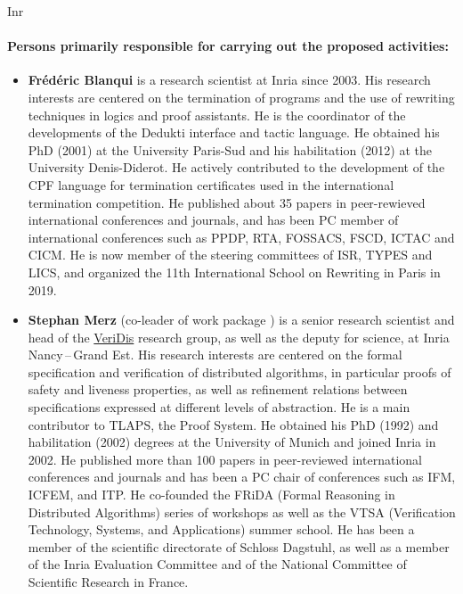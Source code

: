 \begin{sitedescription}{Inr}
\paragraph{Persons primarily responsible for carrying out the proposed activities:}

\begin{itemize} %

\item{\bf Frédéric Blanqui} is a research scientist at Inria since 2003. His research interests are centered on the termination of programs and the use of rewriting techniques in logics and proof assistants. He is the coordinator of the developments of the Dedukti interface and tactic language. He obtained his PhD (2001) at the University Paris-Sud and his habilitation (2012) at the University Denis-Diderot. He actively contributed to the development of the CPF language for termination certificates used in the international termination competition. He published about 35 papers in peer-rewieved international conferences and journals, and has been PC member of international conferences such as PPDP, RTA, FOSSACS, FSCD, ICTAC and CICM. He is now member of the steering committees of ISR, TYPES and LICS, and organized the 11th International School on Rewriting in Paris in 2019.
  
\item{\bf Stephan Merz} (co-leader of work package ) is a senior research
scientist and head of the \href{https://team.inria.fr/veridis/}{VeriDis}
research group, as well as the deputy for science, at Inria Nancy\,--\,Grand Est.
His research interests are centered on the formal specification and verification
of distributed algorithms, in particular proofs of safety and liveness
properties, as well as refinement relations between specifications expressed at
different levels of abstraction. He is a main contributor to TLAPS, the \tlaplus
Proof System. He obtained his PhD (1992) and habilitation (2002) degrees at the
University of Munich and joined Inria in 2002. He published more than 100 papers
in peer-reviewed international conferences and journals and has been a PC chair
of conferences such as IFM, ICFEM, and ITP. He co-founded the FRiDA (Formal
Reasoning in Distributed Algorithms) series of workshops as well as the VTSA
(Verification Technology, Systems, and Applications) summer school. He has been
a member of the scientific directorate of Schloss Dagstuhl, as well as a member
of the Inria Evaluation Committee and of the National Committee of Scientific
Research in France.


\end{itemize}
\end{sitedescription}
